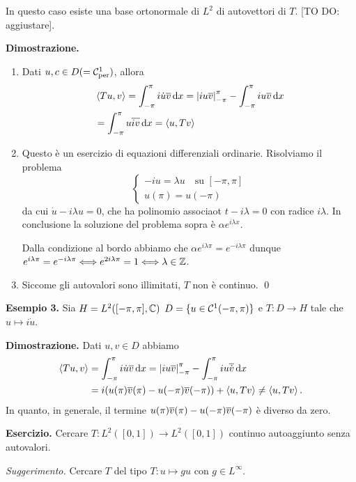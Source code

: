 In questo caso esiste una base ortonormale di $L^2$ di autovettori di $T$. [TO DO: aggiustare].

\textbf{Dimostrazione.} 
\begin{enumerate}

	\item Dati $u,c \in D (= \mathcal{C}_{\operatorname{per}}^1)$, allora
	\begin{align*}
		& \left<Tu,v \right> = \int_{-\pi}^\pi i \dot u \overline{v} \,\mathrm{d} x = \left| i u \overline{v} \right|_{-\pi}^\pi - \int_{-\pi}^\pi i u \overline{v} \,\mathrm{d} x \\
		& = \int_{-\pi}^\pi u \overline{iv} \,\mathrm{d} x 
		= \left<u, Tv \right>
	\end{align*}


	\item Questo è un esercizio di equazioni differenziali ordinarie. Risolviamo il problema
	$$
	\begin{cases}
		-iu = \lambda u \quad \text{su } [-\pi,\pi] \\
		u(\pi) = u(-\pi)
	\end{cases} 
	$$
	da cui $\dot u - i \lambda u = 0$, che ha polinomio associaot $t - i\lambda = 0$ con radice  $i\lambda$. In conclusione la soluzione del problema sopra è $\alpha e^{i\lambda x}$.

	Dalla condizione al bordo abbiamo che $\alpha e^{i\lambda \pi} = e^{-i\lambda \pi}$ dunque $e^{i\lambda \pi} = e^{- i\lambda \pi} \Longleftrightarrow e^{2i\lambda \pi} = 1 \Longleftrightarrow \lambda \in \mathbb Z$.


	\item Siccome gli autovalori sono illimitati, $T$ non è continuo.
\qed

\end{enumerate}


\textbf{Esempio 3.} Sia $H = L^2([-\pi,\pi], \mathbb C)$ $D = \{ u \in \mathcal{C}^1(-\pi,\pi) \}$ e $T \colon D \to H$ tale che $u \mapsto i\dot u$.

\textbf{Dimostrazione.} Dati $u,v \in D$ abbiamo
\begin{align*}
	\left<Tu,v \right> & = \int_{-\pi}^{\pi} i \dot u \overline{v} \,\mathrm{d} x  = \left| i u \overline{v} \right|_{-\pi}^\pi - \int_{-\pi}^\pi i u \overline{\dot v} \,\mathrm{d} x \\
	& = i (u(\pi) \overline{v}(\pi) - u(- \pi) \overline{v}(-\pi)) + \left<u, Tv \right> \neq \left<u, Tv \right>.
\end{align*}
In quanto, in generale, il termine $u(\pi) \overline{v}(\pi) - u(- \pi) \overline{v}(-\pi)$ è diverso da zero.


\textbf{Esercizio.} Cercare $T \colon L^2([0,1]) \to L^2([0,1])$ continuo autoaggiunto senza autovalori.

\textit{Suggerimento.} Cercare $T$ del tipo $T \colon u \mapsto gu$ con $g \in L^\infty$.
